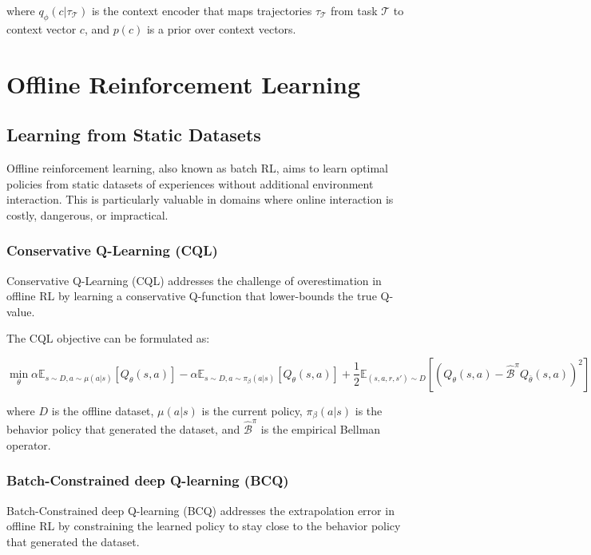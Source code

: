 \documentclass{article}
\begin{document}
where $q_\phi(c | \tau_{\mathcal{T}})$ is the context encoder that maps trajectories $\tau_{\mathcal{T}}$ from task $\mathcal{T}$ to context vector $c$, and $p(c)$ is a prior over context vectors.

\section{Offline Reinforcement Learning}

\subsection{Learning from Static Datasets}

Offline reinforcement learning, also known as batch RL, aims to learn optimal policies from static datasets of experiences without additional environment interaction. This is particularly valuable in domains where online interaction is costly, dangerous, or impractical.

\subsubsection{Conservative Q-Learning (CQL)}

Conservative Q-Learning (CQL) addresses the challenge of overestimation in offline RL by learning a conservative Q-function that lower-bounds the true Q-value.

The CQL objective can be formulated as:

\begin{equation}
\min_{\theta} \alpha \mathbb{E}_{s \sim D, a \sim \mu(a|s)} [Q_\theta(s, a)] - \alpha \mathbb{E}_{s \sim D, a \sim \pi_\beta(a|s)} [Q_\theta(s, a)] + \frac{1}{2} \mathbb{E}_{(s,a,r,s') \sim D} [(Q_\theta(s, a) - \hat{\mathcal{B}}^\pi Q_{\bar{\theta}}(s, a))^2]
\end{equation}

where $D$ is the offline dataset, $\mu(a|s)$ is the current policy, $\pi_\beta(a|s)$ is the behavior policy that generated the dataset, and $\hat{\mathcal{B}}^\pi$ is the empirical Bellman operator.

\subsubsection{Batch-Constrained deep Q-learning (BCQ)}

Batch-Constrained deep Q-learning (BCQ) addresses the extrapolation error in offline RL by constraining the learned policy to stay close to the behavior policy that generated the dataset.
\end{document}
